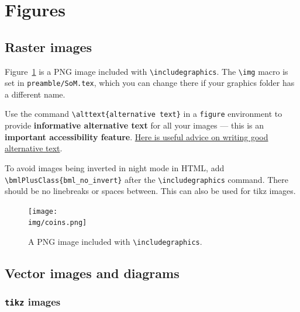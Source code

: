 \section{Figures}
\label{demo:fig}

\subsection{Raster images}
\label{demo:fig:raster}

Figure~\ref{fig:coins} is a PNG image included with \verb|\includegraphics|. The \verb|\img| macro is set in \texttt{preamble/SoM.tex}, which you can change there if your graphics folder has a different name.

Use the command \verb|\alttext{alternative text}| in a \texttt{figure} environment to provide \textbf{informative alternative text} for all your images --- this is an \textbf{important accessibility feature}. \href{https://accessibility.huit.harvard.edu/describe-content-images}{Here is useful advice on writing good alternative text}.

To avoid images being inverted in night mode in HTML, add \verb|\bmlPlusClass{bml_no_invert}| after the \verb|\includegraphics| command. There should be no linebreaks or spaces between. This can also be used for tikz images.

\begin{figure}[H]
    \centering
    \texttt{[image: \\img/coins.png]}
    \caption{A PNG image included with \texttt{\textbackslash includegraphics}.}
    \label{fig:coins}
\end{figure}


\subsection{Vector images and diagrams}

\subsubsection{\texttt{tikz} images}
\label{demo:fig:tikz}

